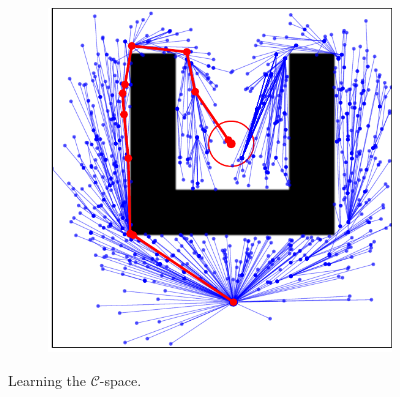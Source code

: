 \documentclass{beamer}
\begin{document}
\begin{frame}
\begin{figure}[!ht]
\begin{subfigure}[b]{0.45\textwidth}
		\end{subfigure}  
		\begin{subfigure}[b]{0.45\textwidth}
			\includegraphics[width=\textwidth]{figChap4/RRTstarML_maze206.0.pdf}
			 
		\end{subfigure}
		\caption{Learning the $\mathcal{C}$-space.}
		\label{fig:LearningConfigSpace}
	  \end{figure}
\end{frame}	


			 
			 
\end{document}
